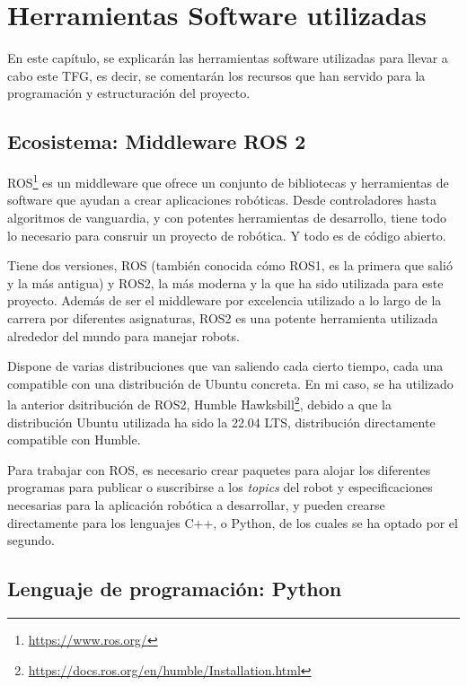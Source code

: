 \chapter{Herramientas Software utilizadas}\label{cap:herramientas}

 En este capítulo, se explicarán las herramientas software utilizadas para llevar a cabo este TFG, es decir, se comentarán los recursos que han servido para la programación y estructuración del proyecto.

\section{Ecosistema: Middleware ROS 2}

ROS\footnote{\url{https://www.ros.org/}} es un middleware que ofrece un conjunto de bibliotecas y herramientas de software que ayudan a crear aplicaciones robóticas. Desde controladores hasta algoritmos de vanguardia, y con potentes herramientas de desarrollo, tiene todo lo necesario para consruir un proyecto de robótica. Y todo es de código abierto.

Tiene dos versiones, ROS (también conocida cómo ROS1, es la primera que salió y la más antigua) y ROS2, la más moderna y la que ha sido utilizada para este proyecto. Además de ser el middleware por excelencia utilizado a lo largo de la carrera por diferentes asignaturas, ROS2 es una potente herramienta utilizada alrededor del mundo para manejar robots.

Dispone de varias distribuciones que van saliendo cada cierto tiempo, cada una compatible con una distribución de Ubuntu concreta. En mi caso, se ha utilizado la anterior dsitribución de ROS2, Humble Hawksbill\footnote{\url{https://docs.ros.org/en/humble/Installation.html}}, debido a que la distribución Ubuntu utilizada ha sido la 22.04 LTS, distribución directamente compatible con Humble.

Para trabajar con ROS, es necesario crear paquetes \cite{tutorial_paquete} para alojar los diferentes programas para publicar o suscribirse a los \textit{topics} del robot \cite{tutorial_pubsub} y especificaciones necesarias para la aplicación robótica a desarrollar, y pueden crearse directamente para los lenguajes C++, o Python, de los cuales se ha optado por el segundo.

\section{Lenguaje de programación: Python}

